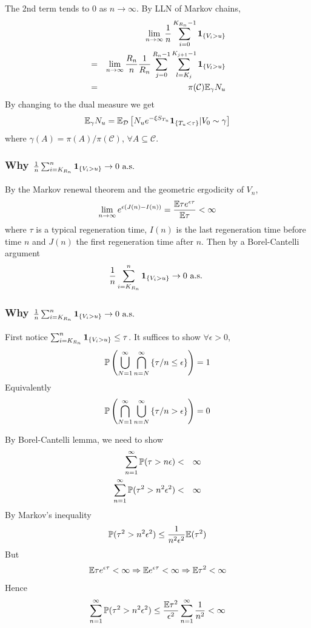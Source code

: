 \documentclass{beamer}
\begin{document}
\begin{frame}
  The 2nd term tends to 0 as $n \to \infty$. By LLN of Markov chains,
  \begin{eqnarray*}
    && \lim_{n \to \infty} {1 \over n}
    \sum_{i=0}^{K_{R_n}-1} \1{V_i > u}  \\
    &=& \lim_{n \to \infty} {R_n \over n}{1 \over R_n}
    \sum_{j=0}^{R_n-1} \sum_{l=K_j}^{K_{j+1}-1} \1{V_l > u} \\
    &=& \pi(\mathcal C) \E_\gamma N_u
  \end{eqnarray*}
  By changing to the dual measure we get
  \[
  \E_\gamma N_u = \E_{\mathcal D} \left[
    N_u e^{-\xi S_{T_u}} \1{T_u < \tau} | V_0 \sim \gamma
  \right]
  \]
  where $\gamma(A) = \pi(A) / \pi(\mathcal C)$,
  $\forall A \subseteq \mathcal C$.
\end{frame}

\begin{frame}
  \frametitle{Why ${1 \over n} \sum_{i=K_{R_n}}^n \1{V_i > u} \to 0
    \text{ a.s. }$}
  By the Markov renewal theorem and the geometric ergodicity of $V_n$,
  \[
  \lim_{n \to \infty} e^{\epsilon(J(n) - I(n))} = {
    \E \tau e^{\epsilon \tau}
    \over
    \E \tau
  }  < \infty
  \]
  where $\tau$ is a typical regeneration time, $I(n)$ is the last
  regeneration time before time $n$ and $J(n)$ the first regeneration
  time after $n$. Then by a Borel-Cantelli argument
  \[
  {1 \over n}\sum_{i=K_{R_n}}^n \1{V_i > u} \to 0 \text{ a.s. }
  \]
\end{frame}

\begin{frame}
  \frametitle{Why ${1 \over n} \sum_{i=K_{R_n}}^n \1{V_i > u} \to 0
    \text{ a.s. }$}
  First notice $ \sum_{i=K_{R_n}}^n \1{V_i > u} \leq \tau$.
  It suffices to show $\forall \epsilon > 0$,
  \[
  \P\left(
    \bigcup_{N=1}^\infty \bigcap_{n=N}^\infty \left\{
      \tau/n \leq \epsilon
      \right\}
  \right) = 1
  \]
  Equivalently
  \[
  \P\left(
    \bigcap_{N=1}^\infty \bigcup_{n=N}^\infty \left\{
      \tau/n > \epsilon
      \right\}
  \right) = 0
  \]
\end{frame}

\begin{frame}
  By Borel-Cantelli lemma, we need to show
  \begin{eqnarray*}
    \sum_{n=1}^\infty \P(\tau > n\epsilon) &<& \infty \\
    \sum_{n=1}^\infty \P(\tau^2 > n^2\epsilon^2) &<& \infty \\
  \end{eqnarray*}
  By Markov's inequality
  \[
  \P(\tau^2 > n^2\epsilon^2) \leq {1 \over n^2 \epsilon^2} \E(\tau^2)
  \]
  But
  \[
  \E \tau e^{\epsilon \tau} < \infty \Rightarrow
  \E e^{\epsilon \tau} < \infty \Rightarrow
  \E \tau^2 < \infty
  \]
  Hence
  \[
  \sum_{n=1}^\infty \P(\tau^2 > n^2\epsilon^2) \leq
  {
    \E \tau^2
    \over
    \epsilon^2
  }
\sum_{n=1}^\infty  {1 \over n^2} < \infty
  \]
\end{frame}



\end{document}
